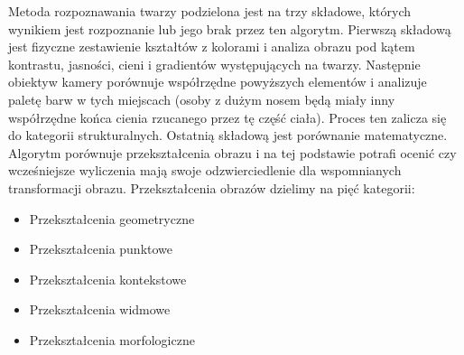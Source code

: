 \documentclass{article}
\begin{document}
\par
Metoda rozpoznawania twarzy podzielona jest na trzy składowe, których wynikiem jest rozpoznanie lub jego brak przez ten algorytm. Pierwszą składową jest fizyczne zestawienie kształtów z kolorami i analiza obrazu pod kątem kontrastu, jasności, cieni i gradientów występujących na twarzy. Następnie obiektyw kamery porównuje współrzędne powyższych elementów i analizuje paletę barw w tych miejscach (osoby z dużym nosem będą miały inny współrzędne końca cienia rzucanego przez tę część ciała). Proces ten zalicza się do kategorii strukturalnych. Ostatnią składową jest porównanie matematyczne. Algorytm porównuje przekształcenia obrazu i na tej podstawie potrafi ocenić czy wcześniejsze wyliczenia mają swoje odzwierciedlenie dla wspomnianych transformacji obrazu. Przekształcenia obrazów dzielimy na pięć kategorii:
\begin{itemize}
	\item Przekształcenia geometryczne
	\item Przekształcenia punktowe
	\item Przekształcenia kontekstowe
	\item Przekształcenia widmowe
	\item Przekształcenia morfologiczne	
\end{itemize}
\end{document}
